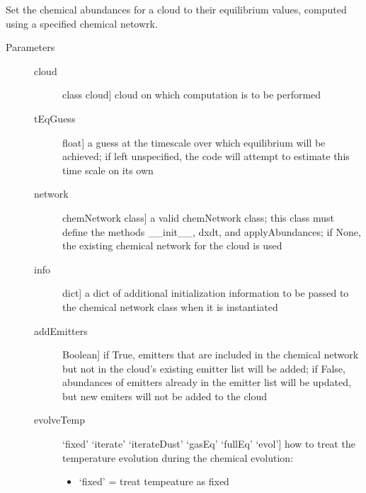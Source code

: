 \documentclass[letterpaper,10pt,english]{sphinxmanual}
\begin{document}
\begin{fulllineitems}
\label{fulldoc:despotic.chemistry.setChemEq}
Set the chemical abundances for a cloud to their equilibrium
values, computed using a specified chemical netowrk.
\begin{description}
\item[{Parameters}] \leavevmode\begin{description}
\item[{cloud}] \leavevmode{[}class cloud{]}
cloud on which computation is to be performed

\item[{tEqGuess}] \leavevmode{[}float{]}
a guess at the timescale over which equilibrium will be
achieved; if left unspecified, the code will attempt to
estimate this time scale on its own

\item[{network}] \leavevmode{[}chemNetwork class{]}
a valid chemNetwork class; this class must define the
methods \_\_init\_\_, dxdt, and applyAbundances; if None, the
existing chemical network for the cloud is used

\item[{info}] \leavevmode{[}dict{]}
a dict of additional initialization information to be passed
to the chemical network class when it is instantiated

\item[{addEmitters}] \leavevmode{[}Boolean{]}
if True, emitters that are included in the chemical
network but not in the cloud's existing emitter list will
be added; if False, abundances of emitters already in the
emitter list will be updated, but new emiters will not be
added to the cloud

\item[{evolveTemp}] \leavevmode{[}`fixed' \textbar{} `iterate' \textbar{} `iterateDust' \textbar{} `gasEq' \textbar{} `fullEq' \textbar{} `evol'{]}
how to treat the temperature evolution during the chemical
evolution:
\begin{itemize}
\item {} 
`fixed' = treat tempeature as fixed


\end{itemize}
\end{description}
\end{description}
\end{fulllineitems}
\end{document}

